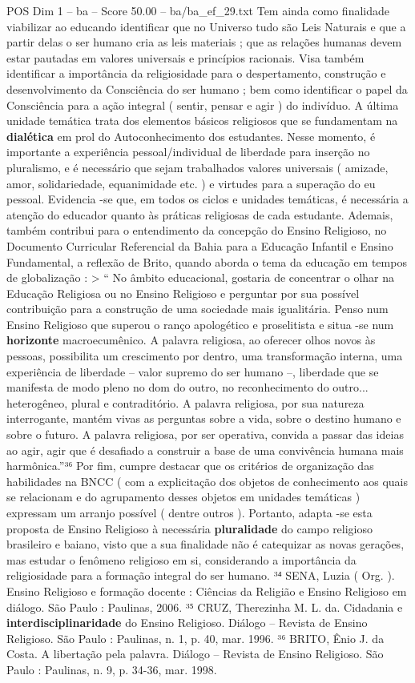 \begin{textsample}{POS Dim 1 – ba – Score 50.00 – ba/ba\_ef\_29.txt}
Tem ainda como finalidade viabilizar ao educando identificar que no Universo tudo são Leis Naturais e que a partir delas o ser humano cria as leis materiais ; que as relações humanas devem estar pautadas em valores universais e princípios racionais.
Visa também identificar a importância da religiosidade para o despertamento, construção e desenvolvimento da Consciência do ser humano ; bem como identificar o papel da Consciência para a ação integral ( sentir, pensar e agir ) do indivíduo.
A última unidade temática trata dos elementos básicos religiosos que se fundamentam na \textbf{dialética} em prol do Autoconhecimento dos estudantes.
Nesse momento, é importante a experiência pessoal/individual de liberdade para inserção no pluralismo, e é necessário que sejam trabalhados valores universais ( amizade, amor, solidariedade, equanimidade etc. ) e virtudes para a superação do eu pessoal.
Evidencia -se que, em todos os ciclos e unidades temáticas, é necessária a atenção do educador quanto às práticas religiosas de cada estudante.
Ademais, também contribui para o entendimento da concepção do Ensino Religioso, no Documento Curricular Referencial da Bahia para a Educação Infantil e Ensino Fundamental, a reflexão de Brito, quando aborda o tema da educação em tempos de globalização : > “ No âmbito educacional, gostaria de concentrar o olhar na Educação Religiosa ou no Ensino Religioso e perguntar por sua possível contribuição para a construção de uma sociedade mais igualitária.
Penso num Ensino Religioso que superou o ranço apologético e proselitista e situa -se num \textbf{horizonte} macroecumênico.
A palavra religiosa, ao oferecer olhos novos às pessoas, possibilita um crescimento por dentro, uma transformação interna, uma experiência de liberdade – valor supremo do ser humano –, liberdade que se manifesta de modo pleno no dom do outro, no reconhecimento do outro... heterogêneo, plural e contraditório.
A palavra religiosa, por sua natureza interrogante, mantém vivas as perguntas sobre a vida, sobre o destino humano e sobre o futuro.
A palavra religiosa, por ser operativa, convida a passar das ideias ao agir, agir que é desafiado a construir a base de uma convivência humana mais harmônica.”³⁶ Por fim, cumpre destacar que os critérios de organização das habilidades na BNCC ( com a explicitação dos objetos de conhecimento aos quais se relacionam e do agrupamento desses objetos em unidades temáticas ) expressam um arranjo possível ( dentre outros ).
Portanto, adapta -se esta proposta de Ensino Religioso à necessária \textbf{pluralidade} do campo religioso brasileiro e baiano, visto que a sua finalidade não é catequizar as novas gerações, mas estudar o fenômeno religioso em si, considerando a importância da religiosidade para a formação integral do ser humano. ³⁴ SENA, Luzia ( Org. ).
Ensino Religioso e formação docente : Ciências da Religião e Ensino Religioso em diálogo.
São Paulo : Paulinas, 2006. ³⁵ CRUZ, Therezinha M.
L. da.
Cidadania e \textbf{interdisciplinaridade} do Ensino Religioso.
Diálogo – Revista de Ensino Religioso.
São Paulo : Paulinas, n. 1, p. 40, mar. 1996. ³⁶ BRITO, Ênio J. da Costa.
A libertação pela palavra.
Diálogo – Revista de Ensino Religioso.
São Paulo : Paulinas, n. 9, p. 34-36, mar. 1998.


\end{textsample}
